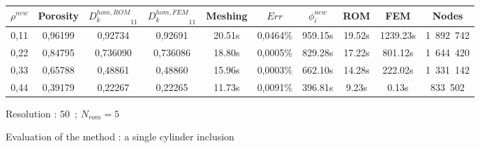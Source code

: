 {\begin{figure}[H]%
%
\begin{center}
\begin{tabular}{|c|c||c|c||c|c||c|c||c||c|}
\hline
\rowcolor{lightgray} $\rho^{new}$&Porosity&${D_k^{hom,ROM}}_{11}$&${D_k^{hom,FEM}}_{11}$&Meshing&$Err$&$\phi_i^{new}$&ROM&FEM&Nodes\\
\hline
0,11&0,96199&0,92734&0,92691&20.51s&0,0464\%&959.15s&19.52s&1239.23s&1\ 892\ 742\\
\hline
0,22&0,84795&0,736090&0,736086&18.80s&0,0005\%&829.28s&17.22s&801.12s&1\ 644\ 420\\
\hline
0,33&0,65788&0,48861&0,48860&15.96s&0,0003\%&662.10s&14.28s&222.02s&1\ 331\ 142\\
\hline
0,44&0,39179&0,22267&0,22265&11.73s&0,0091\%&396.81s&9.23s&0.13s&833\ 502\\
\hline
\end{tabular}
\end{center}
\caption{Resolution : $50$\ ; $N_{rom}=5$}
%
\end{figure}

\ligneinter

\begin{figure}[H]%
%
\begin{table}[H]
\begin{center}
%
%
\qquad
{}%
%
\end{center}
\end{table}
%
\caption{Evaluation of the method : a single cylinder inclusion}
\end{figure}

}
